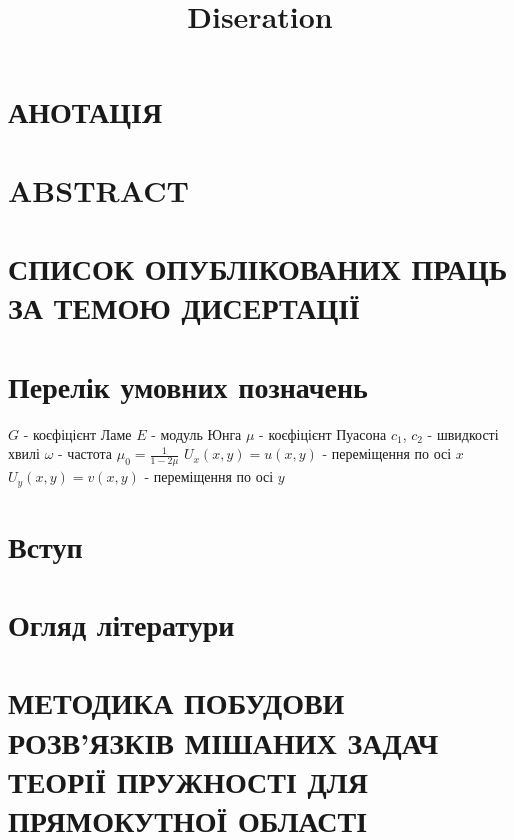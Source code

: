 \documentclass[a4paper,14pt]{extarticle}
\title{Diseration}
\author{}
\date{}
\numberwithin{equation}{section}
\begin{document}
\section*{\centering АНОТАЦІЯ}


\section*{\centering ABSTRACT}


\section*{\centering СПИСОК ОПУБЛІКОВАНИХ ПРАЦЬ ЗА ТЕМОЮ ДИСЕРТАЦІЇ}


\newpage

\renewcommand{\contentsname}{\centering Зміст}
\tableofcontents

\newpage

\section*{\centering Перелік умовних позначень}
$G$ - коєфіцієнт Ламе \newline
$E$ - модуль Юнга \newline
$\mu$ - коєфіцієнт Пуасона \newline
$c_1$, $c_2$ - швидкості хвилі \newline
$\omega$ - частота \newline
$\mu_0 = \frac{1}{1 - 2\mu}$ \newline
$U_x(x,y) = u(x,y)$ - переміщення по осі $x$ \newline
$U_y(x,y) = v(x,y)$ - переміщення по осі $y$
\newpage

\section*{\centering Вступ}

\newpage

\section{\centering Огляд літератури}

\newpage

\section{МЕТОДИКА ПОБУДОВИ РОЗВ’ЯЗКІВ МІШАНИХ ЗАДАЧ ТЕОРІЇ ПРУЖНОСТІ ДЛЯ ПРЯМОКУТНОЇ ОБЛАСТІ}

\newpage
\end{document}
